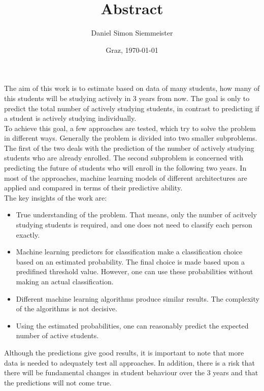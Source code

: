 \documentclass[a4paper, english,11pt]{article}
\title{Abstract}
\author{Daniel Simon Siemmeister}
\date{Graz, \today{}}
\begin{document}
\maketitle
\thispagestyle{empty}

The aim of this work is to estimate based on data of many students, how many of this students will be studying
actively in 3 years from now. The goal is only to predict the total number of actively studying students,
in contrast to predicting if a student is actively studying individually.\\

To achieve this goal, a few approaches are tested, which try to solve the problem in different ways.
Generally the problem is divided into two smaller subproblems. The first of the two deals with the prediction of the number of
actively studying students who are already enrolled.
The second subproblem is concerned with predicting the future of students who will enroll in the following two years.
In most of the approaches, machine learning models of different architectures are applied and compared in terms of their predictive ability.\\

The key insights of the work are:
\begin{itemize}
	\item True understanding of the problem. That means, only the number of acitvely studying students
	      is required, and one does not need to classify each person exactly.
	\item Machine learning predictors for classification make a classification choice based on an estimated probability.
	      The final choice is made based upon a predifined threshold value. However, one can use these probabilities without making an
	      actual classification.
	\item Different machine learning algorithms produce similar results. The complexity of the algorithms is not decisive.
	\item Using the estimated probabilities, one can reasonably predict the expected number of active students.
\end{itemize}

Although the predictions give good results, it is important to note that more data is needed to adequately test all approaches.
In addition, there is a risk that there will be fundamental changes in student behaviour over the 3 years and that the predictions
will not come true.
\end{document}
